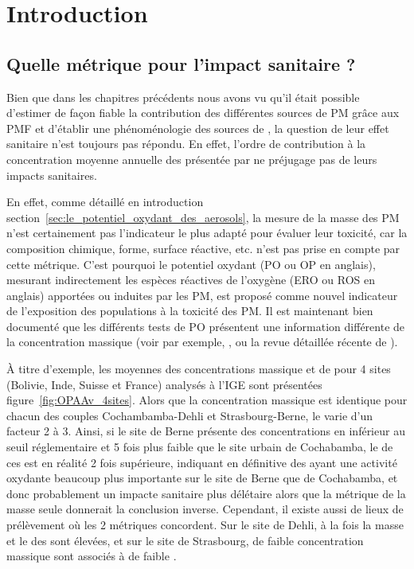 \section{Introduction}%
\label{sec:intro_PO}

\subsection{Quelle métrique pour l'impact sanitaire ?}%
\label{sub:quelle_métrique_pour_l_impact_sanitaire_}


Bien que dans les chapitres précédents nous avons vu qu'il était possible d'estimer de
façon fiable la contribution des différentes sources de PM grâce aux PMF et d'établir une
phénoménologie des sources de \PMdix, la question de leur effet sanitaire n'est toujours
pas répondu. En effet, l'ordre de contribution à la concentration moyenne annuelle des
\PMdix{} présentée par \cite[(figure 3)]{weberComparison2019} ne préjugage pas de leurs
impacts sanitaires.

En effet, comme détaillé en introduction
section~\ref{sec:le_potentiel_oxydant_des_aerosols}, la mesure de la masse des PM n'est
certainement pas l'indicateur le plus adapté pour évaluer leur toxicité, car la composition
chimique, forme, surface réactive, etc. n'est pas prise en compte par cette métrique.
C'est pourquoi le potentiel oxydant (PO ou OP en anglais), mesurant indirectement les
espèces réactives de l'oxygène (ERO ou ROS en anglais) apportées ou induites par les PM,
est proposé comme nouvel indicateur de l'exposition des populations à la toxicité des PM. 
Il est maintenant bien documenté que les différents tests de PO présentent une information
différente de la concentration massique (voir par exemple,
\cite{choRedox2005,vermaReactive2014,batesReactive2015,fangOxidative2016,fangAmbient2017,calasSeasonal2019},
ou la revue détaillée récente de \cite{batesReview2019}).

À titre d'exemple, les moyennes des concentrations massique et de \POAAv{} pour 4 sites (Bolivie,
Inde, Suisse et France) analysés à l'IGE sont présentées figure~\ref{fig:OPAAv_4sites}.
Alors que la concentration massique est identique pour chacun des couples
Cochambamba-Dehli et Strasbourg-Berne, le \POAAv{} varie d'un facteur 2 à 3.  Ainsi, si
le site de Berne présente des concentrations en \PMdix{} inférieur au seuil réglementaire
et 5 fois plus faible que le site urbain de Cochabamba, le \POAAv{} de ces \PMdix{} est
en réalité 2 fois supérieure, indiquant en définitive des \PMdix{} ayant une activité
oxydante beaucoup plus importante sur le site de Berne que de Cochabamba, et donc
probablement un impacte sanitaire plus délétaire alors que la métrique de la masse seule
donnerait la conclusion inverse.
Cependant, il existe aussi de lieux de prélèvement où les 2 métriques concordent. Sur le
site de Dehli, à la fois la masse et le \POAAv{} des \PMdix{} sont élevées, et sur le
site de Strasbourg, de faible concentration massique sont associés à de faible \POAAv.

